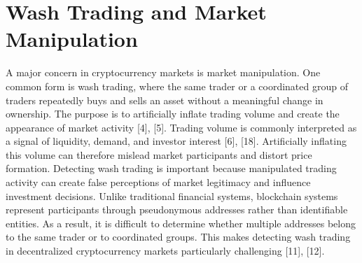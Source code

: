 \documentclass[language=english,thesis=bachelor,nosecondtitle,onesided,faculty=cb]{hsmw-thesis}
\begin{document}
	\section{Wash Trading and Market Manipulation}
A major concern in cryptocurrency markets is market manipulation. One common form is wash trading, where the same trader or a coordinated group of traders repeatedly buys and sells an asset without a meaningful change in ownership. The purpose is to artificially inflate trading volume and create the appearance of market activity [4], [5].
Trading volume is commonly interpreted as a signal of liquidity, demand, and investor interest [6], [18]. Artificially inflating this volume can therefore mislead market participants and distort price formation. Detecting wash trading is important because manipulated trading activity can create false perceptions of market legitimacy and influence investment decisions.
Unlike traditional financial systems, blockchain systems represent participants through pseudonymous addresses rather than identifiable entities. As a result, it is difficult to determine whether multiple addresses belong to the same trader or to coordinated groups. This makes detecting wash trading in decentralized cryptocurrency markets particularly challenging [11], [12].
\end{document}
